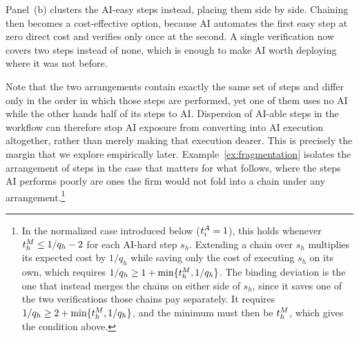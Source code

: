 \begin{example}
Panel~(b) clusters the AI-easy steps instead, placing them side by side.
Chaining then becomes a cost-effective option, because AI automates the first easy step at zero direct cost and verifies only once at the second.
A single verification now covers two steps instead of none, which is enough to make AI worth deploying where it was not before.
\end{example}

Note that the two arrangements contain exactly the same set of steps and differ only in the order in which those steps are performed, yet one of them uses no AI while the other hands half of its steps to AI.
Dispersion of AI-able steps in the workflow can therefore stop AI exposure from converting into AI execution altogether, rather than merely making that execution dearer.
This is precisely the margin that we explore empirically later.
Example~\ref{ex:fragmentation} isolates the arrangement of steps in the case that matters for what follows, where the steps AI performs poorly are ones the firm would not fold into a chain under any arrangement.\footnote{In the normalized case introduced below ($t^{A}_{i} = 1$), this holds whenever $t^{M}_{h} \leq 1/q_h - 2$ for each AI-hard step $s_h$. Extending a chain over $s_h$ multiplies its expected cost by $1/q_h$ while saving only the cost of executing $s_h$ on its own, which requires $1/q_h \geq 1 + \min\{t^{M}_{h}, 1/q_h\}$. The binding deviation is the one that instead merges the chains on either side of $s_h$, since it saves one of the two verifications those chains pay separately. It requires $1/q_h \geq 2 + \min\{t^{M}_{h}, 1/q_h\}$, and the minimum must then be $t^{M}_{h}$, which gives the condition above.}

